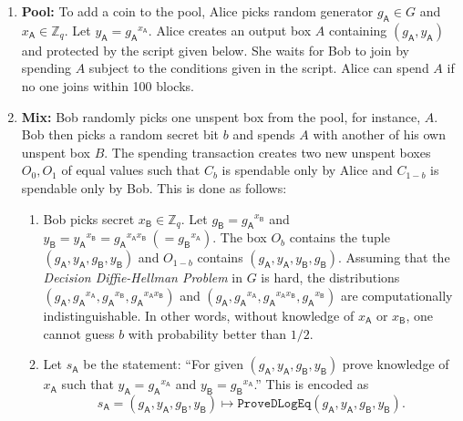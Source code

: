 \documentclass[11pt]{article}
\begin{document}
\begin{enumerate}
	\item \textbf{Pool:} To add a coin to the pool, Alice picks random generator $g_\textsf{A}\in G$ and $x_\textsf{A}\in \mathbb{Z}_q$. Let $y_\textsf{A} = {g_\textsf{A}}^{x_\textsf{A}}$. Alice creates an output box $A$ containing $(g_\textsf{A}, y_\textsf{A})$ and protected by the script given below. She waits for Bob to join by spending $A$ subject to the conditions given in the script. Alice can spend $A$ if no one joins within 100 blocks. 
	\item \textbf{Mix:} Bob randomly picks one unspent box from the pool, for instance, $A$. Bob then picks a random secret bit $b$ and spends $A$ with another of his own unspent box $B$. The spending transaction creates two new unspent boxes $O_0, O_1$ of equal values such that $C_b$ is spendable only by Alice and $C_{1-b}$ is spendable only by Bob. This is done as follows:
	
	\begin{enumerate}
		
		\item Bob picks secret $x_\textsf{B}\in \mathbb{Z}_q$. Let $g_\textsf{B} = {g_\textsf{A}}^{x_\textsf{B}}$ and $y_\textsf{B} = {y_\textsf{A}}^{x_\textsf{B}} = {g_\textsf{A}}^{x_\textsf{A}x_\textsf{B}}~(={g_\textsf{B}}^{x_\textsf{A}})$.  %
		The box $O_b$ contains the tuple $(g_\textsf{A}, y_\textsf{A}, g_\textsf{B}, y_\textsf{B})$ and $O_{1-b}$ contains $(g_\textsf{A}, y_\textsf{A}, y_\textsf{B}, g_\textsf{B})$. Assuming that the {\em Decision Diffie-Hellman Problem} in $G$ is hard, the distributions $(g_\textsf{A}, {g_\textsf{A}}^{x_\textsf{A}}, {g_\textsf{A}}^{x_\textsf{B}}, {g_\textsf{A}}^{x_\textsf{A}x_\textsf{B}})$ and $(g_\textsf{A}, {g_\textsf{A}}^{x_\textsf{A}}, {g_\textsf{A}}^{x_\textsf{A}x_\textsf{B}}, {g_\textsf{A}}^{x_\textsf{B}})$ are computationally indistinguishable. In other words, without knowledge of $x_\textsf{A}$ or $x_\textsf{B}$, one cannot guess $b$ with probability better than $1/2$.
		\item  Let 
		$s_\textsf{A}$ be the statement: ``For given $(g_\textsf{A}, y_\textsf{A}, g_\textsf{B}, y_\textsf{B})$ 
		prove knowledge of $x_\textsf{A}$ such that $y_\textsf{A} = {g_\textsf{A}}^{x_\textsf{A}}$ and ${y_\textsf{B}} = {g_\textsf{B}}^{x_\textsf{A}}$.'' This is encoded as $$s_\textsf{A} = (g_\textsf{A}, y_\textsf{A}, g_\textsf{B}, y_\textsf{B}) \mapsto \texttt{ProveDLogEq}(g_\textsf{A}, y_\textsf{A}, g_\textsf{B}, y_\textsf{B}).$$
		

\end{enumerate}
\end{enumerate}
\end{document}
